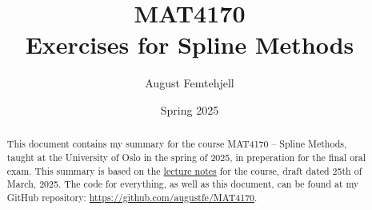 \documentclass[
    a4paper,
    12pt,
]{article}
\title{
    MAT4170\\
    \small{Exercises for Spline Methods}
}
\author{August Femtehjell}
\date{Spring 2025}
\theoremstyle{breaktheorem}
\numberwithin{equation}{section}
\begin{document}
\maketitle

\tableofcontents

\begin{abstract}
    This document contains my summary for the course MAT4170 -- Spline Methods, taught at the University of Oslo in the spring of 2025, in preperation for the final oral exam. %
    This summary is based on the \href{https://www.uio.no/studier/emner/matnat/math/MAT4170/v25/undervisningsmateriale/spline_notes.pdf}{lecture notes} for the course, draft dated 25th of March, 2025.
    The code for everything, as well as this document, can be found at my GitHub repository: \url{https://github.com/augustfe/MAT4170}.
\end{abstract}




\end{document}
